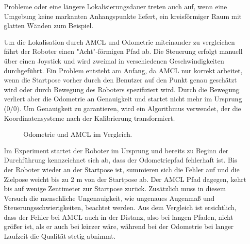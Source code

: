 \documentclass[11pt,a4paper]{article}
\begin{document}
{Probleme oder eine l\"angere Lokalisierungsdauer treten auch auf, wenn eine Umgebung keine markanten Anhangspunkte liefert, ein kreisf\"ormiger Raum mit glatten W\"anden zum Beispiel. 

Um die Lokalisation durch AMCL und Odometrie miteinander zu vergleichen f\"ahrt der Roboter einen "Acht"-f\"ormigen Pfad ab. Die Steuerung erfolgt manuell \"uber einen Joystick und wird zweimal in verschiedenen Geschwindigkeiten durchgef\"uhrt. Ein Problem entsteht am Anfang, da AMCL nur korrekt arbeitet, wenn die Startpose vorher durch den Benutzer auf den Punkt genau gesch\"atzt wird oder durch Bewegung des Roboters spezifiziert wird. Durch die Bewegung verliert aber die Odometrie an Genauigkeit und startet nicht mehr im Ursprung (0/0). Um Genauigkeit zu garantieren, wird ein Algorithmus verwendet, der die Koordinatensysteme nach der Kalibrierung transformiert.

\begin{figure}[h]
	\centering
	\par\medskip
	\caption{ Odometrie und AMCL im Vergleich. }
\end{figure}




Im Experiment startet der Roboter im Ursprung und bereits zu Beginn der Durchf\"uhrung kennzeichnet sich ab, dass der Odometriepfad fehlerhaft ist. Bis der Roboter wieder an der Startpose ist, summieren sich die Fehler auf und die Zielpose weicht bis zu 2 m von der Startpose ab. Der AMCL Pfad dagegen, kehrt bis auf wenige Zentimeter zur Startpose zur\"uck. Zus\"atzlich muss in diesem Versuch die menschliche Ungenauigkeit, wie ungenaues Augenma{\ss} und Steuerungsschwierigkeiten, beachtet werden. Aus dem Vergleich ist ersichtlich, dass der Fehler bei AMCL auch in der Distanz, also bei langen Pfaden, nicht gr\"o{\ss}er ist, als er auch bei k\"urzer w\"are, w\"ahrend bei der Odometrie bei langer Laufzeit die Qualit\"at stetig abnimmt.


}
\end{document}
